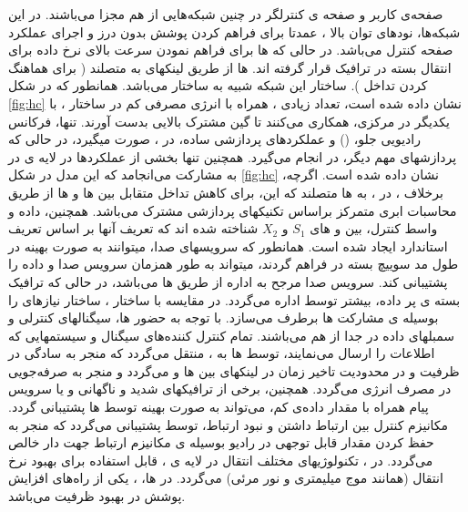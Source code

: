 \begin{itemize}
صفحه‌ی کاربر و صفحه ی کنترلگر در چنین شبکه‌هایی از هم مجزا می‌باشند. 
در این شبکه‌ها، نودهای توان بالا   ، عمدتا برای فراهم کردن پوشش بدون درز و اجرای عملکرد صفحه کنترل می‌باشد. در حالی که ها برای فراهم نمودن سرعت بالای نرخ داده برای انتقال بسته در ترافیک قرار گرفته اند. ها از طریق لینکهای   به  متصلند ( برای هماهنگ کردن تداخل ).\newline
ساختار این شبکه شبیه به ساختار  می‌باشد. همانطور که در شکل \eqref{fig:hc} نشان داده شده است، تعداد زیادی ، همراه با انرژی مصرفی کم در ساختار ، با یکدیگر در  مرکزی، همکاری می‌کنند تا گین مشترک بالایی بدست آورند. تنها‌، فرکانس رادیویی جلو، () و عملکردهای پردازشی  ساده، در ، صورت میگیرد، در حالی که پردازشهای مهم دیگر، در  انجام می‌گیرد. همچنین تنها بخشی از عملکردها در لایه ی  در  به مشارکت می‌انجامد که این مدل در شکل \eqref{fig:hc} نشان داده شده است.\newline
اگرچه، برخلاف ،
 در ، به ها متصلند که این، برای کاهش تداخل متقابل بین ها و ها از طریق محاسبات ابری متمرکز براساس تکنیکهای پردازشی مشترک می‌باشد. همچنین، داده و واسط کنترل، بین  و های $S_1$ و $X_2$ شناخته شده اند که تعریف آنها بر اساس تعریف استاندارد  ایجاد شده است.\newline
همانطور که سرویسهای صدا، میتوانند به صورت بهینه در طول مد سوییچ بسته در  فراهم گردند،  میتواند به طور همزمان سرویس صدا و داده را پشتیبانی کند. سرویس صدا مرجح به اداره از طریق ها می‌باشد، در حالی که ترافیک بسته ی پر داده، بیشتر توسط  اداره می‌گردد. 
در مقایسه با ساختار ، ساختار  نیازهای  را بوسیله ی مشارکت ها برطرف می‌سازد. با توجه به حضور ها، سیگنالهای کنترلی و سمبلهای داده در  جدا از هم می‌باشند. تمام کنترل کننده‌های سیگنال و سیستمهایی که اطلاعات را ارسال می‌نمایند، توسط ها به ، منتقل می‌گردد که منجر به سادگی در ظرفیت و در محدودیت تاخیر زمان در لینکهای  بین ها و   می‌گردد و منجر به صرفه‌جویی در مصرف انرژی می‌گردد. همچنین، برخی از ترافیکهای شدید و ناگهانی  و یا سرویس پیام همراه با مقدار داده‌ی کم، می‌تواند به صورت بهینه توسط ها پشتیبانی گردد. مکانیزم کنترل بین ارتباط داشتن و نبود ارتباط، توسط  پشتیبانی می‌گردد که منجر به حفظ کردن مقدار قابل توجهی  در رادیو بوسیله ی مکانیزم ارتباط جهت دار خالص می‌گردد. در ، تکنولوژیهای مختلف انتقال در لایه ی ، قابل استفاده برای بهبود نرخ انتقال (همانند موج میلیمتری و نور مرئی) می‌گردد. در ها، ، یکی از راه‌های افزایش پوشش در بهبود ظرفیت می‌باشد.


\end{itemize}
